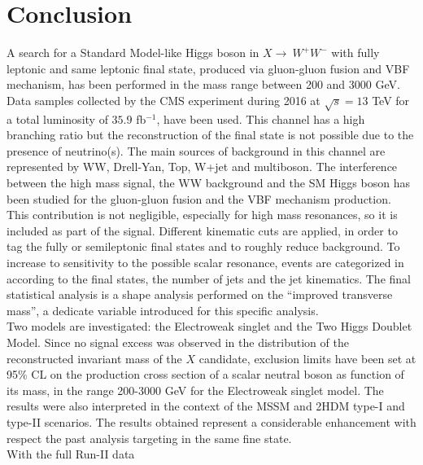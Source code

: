 \chapter*{Conclusion}
A search for a Standard Model-like Higgs boson in $X \to \ W^+W^-$ with fully leptonic and same leptonic final state, produced via gluon-gluon fusion and VBF 
mechanism, has been performed in the mass range between 200 and 3000 GeV.
Data samples collected by the CMS experiment during 2016 at $\sqrt{s}=13$ TeV for a total luminosity of $35.9$ fb$^{-1}$, have been used.
This channel has a high branching ratio but the reconstruction of the final state is not possible due to the presence of neutrino(s). 
The main sources of background in this channel are represented by WW, Drell-Yan, Top, W+jet and multiboson.
The interference between the high mass signal, the WW background and the SM Higgs boson has been studied for the gluon-gluon fusion and the VBF mechanism production.
This contribution is not negligible, especially for high mass resonances, so   it is included as part of the signal.
Different kinematic cuts are applied, in order to tag the fully or semileptonic final states and to roughly reduce background. 
To increase to sensitivity to the possible scalar resonance, events are categorized in according to the final states, the number of jets 
and the jet kinematics. 
The final statistical analysis is a shape analysis performed on the ``improved transverse mass'', a dedicate variable
introduced for this specific analysis.\\
Two models are investigated: the Electroweak singlet and the Two Higgs Doublet Model.
Since no signal excess was observed in the distribution of the reconstructed invariant 
mass of the $X$ candidate,  exclusion limits have been set at 95\% CL on the production cross section of a scalar neutral boson
as function of its mass, in the range 200-3000 GeV for the Electroweak singlet model.
The results were also interpreted in the context of the MSSM
and 2HDM type-I and type-II scenarios.  The results obtained represent a considerable enhancement with respect the past analysis 
targeting in the same fine state.\\
\newline
With the full Run-II data













